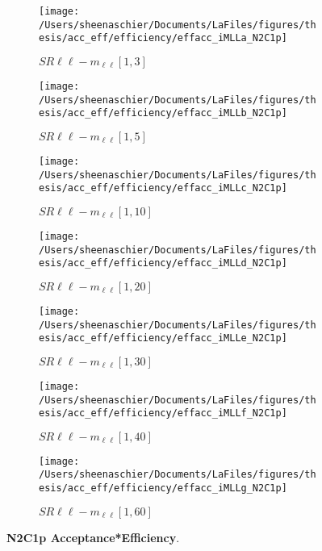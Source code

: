 \begin{figure}
        \centering
    \begin{subfigure}[b]{0.44\textwidth}
        \texttt{[image: /Users/sheenaschier/Documents/LaFiles/figures/thesis/acc\_eff/efficiency/effacc\_iMLLa\_N2C1p]}
    \caption{$SR\ell\ell-m_{\ell\ell} [1, 3]$}
    \end{subfigure}
    \begin{subfigure}[b]{0.44\textwidth}
        \texttt{[image: /Users/sheenaschier/Documents/LaFiles/figures/thesis/acc\_eff/efficiency/effacc\_iMLLb\_N2C1p]}
    \caption{$SR\ell\ell-m_{\ell\ell} [1, 5]$}
    \end{subfigure}
    \begin{subfigure}[b]{0.44\textwidth}
        \texttt{[image: /Users/sheenaschier/Documents/LaFiles/figures/thesis/acc\_eff/efficiency/effacc\_iMLLc\_N2C1p]}
    \caption{$SR\ell\ell-m_{\ell\ell} [1, 10]$}
    \end{subfigure}
    \begin{subfigure}[b]{0.44\textwidth}
        \texttt{[image: /Users/sheenaschier/Documents/LaFiles/figures/thesis/acc\_eff/efficiency/effacc\_iMLLd\_N2C1p]}
    \caption{$SR\ell\ell-m_{\ell\ell} [1, 20]$}
    \end{subfigure}
    \begin{subfigure}[b]{0.44\textwidth}
        \texttt{[image: /Users/sheenaschier/Documents/LaFiles/figures/thesis/acc\_eff/efficiency/effacc\_iMLLe\_N2C1p]}
    \caption{$SR\ell\ell-m_{\ell\ell} [1, 30]$}
    \end{subfigure}
    \begin{subfigure}[b]{0.44\textwidth}
        \texttt{[image: /Users/sheenaschier/Documents/LaFiles/figures/thesis/acc\_eff/efficiency/effacc\_iMLLf\_N2C1p]}
    \caption{$SR\ell\ell-m_{\ell\ell} [1, 40]$}
    \end{subfigure}
    \begin{subfigure}[b]{0.44\textwidth}
        \texttt{[image: /Users/sheenaschier/Documents/LaFiles/figures/thesis/acc\_eff/efficiency/effacc\_iMLLg\_N2C1p]}
    \caption{$SR\ell\ell-m_{\ell\ell} [1, 60]$}
    \end{subfigure}
    \caption{\textbf{N2C1p Acceptance*Efficiency}.}
\end{figure}

